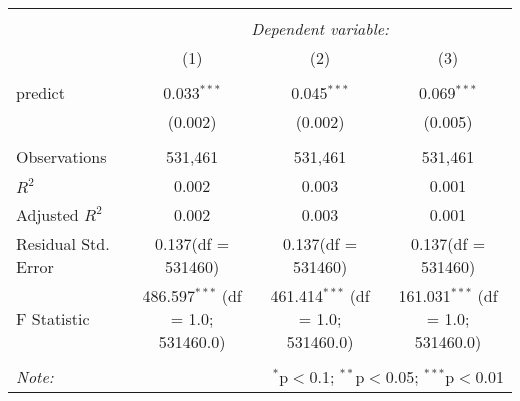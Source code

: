 \begin{table}[!htbp] \centering
\begin{tabular}{@{\extracolsep{5pt}}lccc}
\\[-1.8ex]\hline
\hline \\[-1.8ex]
& \multicolumn{3}{c}{\textit{Dependent variable:}} \
\cr \cline{3-4}
\\[-1.8ex] & (1) & (2) & (3) \\
\hline \\[-1.8ex]
 predict & 0.033$^{***}$ & 0.045$^{***}$ & 0.069$^{***}$ \\
  & (0.002) & (0.002) & (0.005) \\
\hline \\[-1.8ex]
 Observations & 531,461 & 531,461 & 531,461 \\
 $R^2$ & 0.002 & 0.003 & 0.001 \\
 Adjusted $R^2$ & 0.002 & 0.003 & 0.001 \\
 Residual Std. Error & 0.137(df = 531460) & 0.137(df = 531460) & 0.137(df = 531460)  \\
 F Statistic & 486.597$^{***}$ (df = 1.0; 531460.0) & 461.414$^{***}$ (df = 1.0; 531460.0) & 161.031$^{***}$ (df = 1.0; 531460.0) \\
\hline
\hline \\[-1.8ex]
\textit{Note:} & \multicolumn{3}{r}{$^{*}$p$<$0.1; $^{**}$p$<$0.05; $^{***}$p$<$0.01} \\
\end{tabular}
\end{table}
